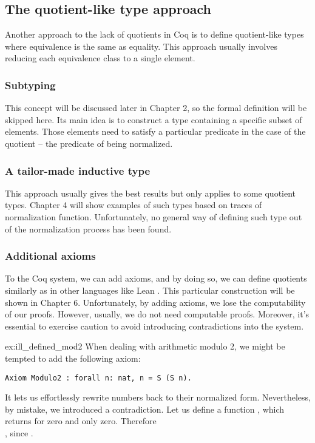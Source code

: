 \subsection{The quotient-like type approach}
Another approach to the lack of quotients in Coq is to define quotient-like types where equivalence is the same as equality. This approach usually involves reducing each equivalence class to a single element.

\subsubsection{Subtyping}
This concept will be discussed later in Chapter 2, so the formal definition will be skipped here. Its main idea is to construct a type containing a specific subset of elements. Those elements need to satisfy a particular predicate in the case of the quotient -- the predicate of being normalized.

\subsubsection{A tailor-made inductive type}
This approach usually gives the best results but only applies to some quotient types. Chapter 4 will show examples of such types based on traces of normalization function. Unfortunately, no general way of defining such type out of the normalization process has been found.

\subsubsection{Additional axioms}
To the Coq system, we can add axioms, and by doing so, we can define quotients similarly as in other languages like Lean \cite{lean4}. This particular construction will be shown in Chapter 6. Unfortunately, by adding axioms, we lose the computability of our proofs. However, usually, we do not need computable proofs. Moreover, it's essential to exercise caution to avoid introducing contradictions into the system.
\begin{example}{}{ex:ill_defined_mod2}
When dealing with arithmetic modulo 2, we might be tempted to add the following axiom:
\begin{verbatim}
Axiom Modulo2 : forall n: nat, n = S (S n).
\end{verbatim}
It lets us effortlessly rewrite numbers back to their normalized form. Nevertheless, by mistake, we introduced a contradiction. Let us define a function , which returns  for zero and only zero. Therefore  \\ , since .
\end{example}


